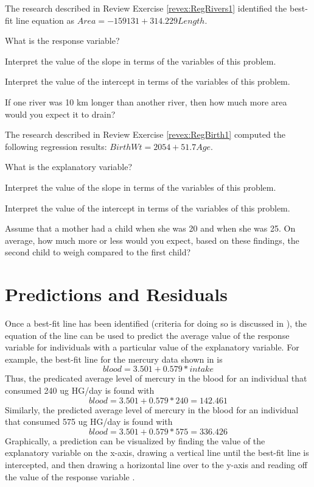 \documentclass[10pt,openany]{book}\usepackage[]{graphicx}\usepackage[]{color}
\begin{document}
\begin{exsection}
  \item \label{revex:RegRivers2} The research described in Review Exercise \ref{revex:RegRivers1} identified the best-fit line equation as $Area=-159131+314.229Length$. 
    \begin{Enumerate}
      \item What is the response variable?
      \item Interpret the value of the slope in terms of the variables of this problem.
      \item Interpret the value of the intercept in terms of the variables of this problem.
      \item If one river was 10 km longer than another river, then how much more area would you expect it to drain?
    \end{Enumerate}

  \item \label{revex:RegBirth2} The research described in Review Exercise \ref{revex:RegBirth1} computed the following regression results: $BirthWt=2054+51.7Age$. 
    \begin{Enumerate}
      \item What is the explanatory variable?
      \item Interpret the value of the slope in terms of the variables of this problem.
      \item Interpret the value of the intercept in terms of the variables of this problem.
      \item Assume that a mother had a child when she was 20 and when she was 25.  On average, how much more or less would you expect, based on these findings, the second child to weigh compared to the first child?
    \end{Enumerate}
\end{exsection}


\section{Predictions and Residuals}
Once a best-fit line has been identified (criteria for doing so is discussed in ), the equation of the line can be used to predict the average value of the response variable for individuals with a particular value of the explanatory variable.  For example, the best-fit line for the mercury data shown in  is
  \[ blood = 3.501 + 0.579*intake \]
Thus, the predicated average level of mercury in the blood for an individual that consumed 240 ug HG/day is found with
  \[ blood = 3.501 + 0.579*240 = 142.461 \]
Similarly, the predicted average level of mercury in the blood for an individual that consumed 575 ug HG/day is found with
  \[ blood = 3.501 + 0.579*575 = 336.426 \]
Graphically, a prediction can be visualized by finding the value of the explanatory variable on the x-axis, drawing a vertical line until the best-fit line is intercepted, and then drawing a horizontal line over to the y-axis and reading off the value of the response variable .
\end{document}
